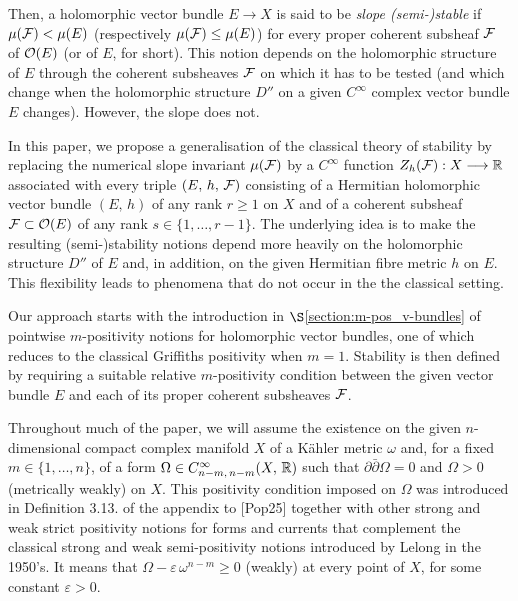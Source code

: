 \documentclass[12pt]{article}
\begin{document}
Then, a holomorphic vector bundle $E\to X$ is said to be {\it slope (semi-)stable} if $\mu({\cal F})<\mu(E)$ (respectively $\mu({\cal F})\leq\mu(E)$) for every proper coherent subsheaf ${\cal F}$ of ${\cal O}(E)$ (or of $E$, for short). This notion depends on the holomorphic structure of $E$ through the coherent subsheaves ${\cal F}$ on which it has to be tested (and which change when the holomorphic structure $D''$ on a given $C^\infty$ complex vector bundle $E$ changes). However, the slope does not.

\vspace{2ex}


In this paper, we propose a generalisation of the classical theory of stability by replacing the numerical slope invariant $\mu({\cal F})$ by a $C^\infty$ function $Z_h({\cal F}):X\longrightarrow\mathbb{R}$ associated with every triple $(E,\,h,\,{\cal F})$ consisting of a Hermitian holomorphic vector bundle $(E,\,h)$ of any rank $r\geq 1$ on $X$ and of a coherent subsheaf ${\cal F}\subset{\cal O}(E)$ of any rank $s\in\{1,\dots , r-1\}$. The underlying idea is to make the resulting (semi-)stability notions depend more heavily on the holomorphic structure $D''$ of $E$ and, in addition, on the given Hermitian fibre metric $h$ on $E$. This flexibility leads to phenomena that do not occur in the the classical setting.

Our approach starts with the introduction in $\S$\ref{section:m-pos_v-bundles} of pointwise $m$-positivity notions for holomorphic vector bundles, one of which reduces to the classical Griffiths positivity when $m=1$. Stability is then defined by requiring a suitable relative $m$-positivity condition between the given vector bundle $E$ and each of its proper coherent subsheaves ${\cal F}$.  

Throughout much of the paper, we will assume the existence on the given $n$-dimensional compact complex manifold $X$ of a K\"ahler metric $\omega$ and, for a fixed $m\in\{1,\dots , n\}$, of a form $\Omega\in C^\infty_{n-m,\,n-m}(X,\,\mathbb{R})$ such that $\partial\bar\partial\Omega = 0$ and $\Omega>0$ (metrically weakly) on $X$. This positivity condition imposed on $\Omega$ was introduced in Definition 3.13. of the appendix to [Pop25] together with other strong and weak strict positivity notions for forms and currents that complement the classical strong and weak semi-positivity notions introduced by Lelong in the 1950's. It means that $\Omega - \varepsilon\,\omega^{n-m}\geq 0$ (weakly) at every point of $X$, for some constant $\varepsilon>0$. 
\end{document}
